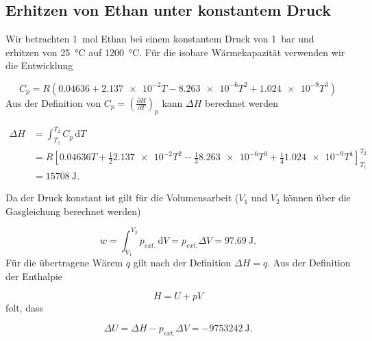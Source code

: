   \subsection{Erhitzen von Ethan unter konstantem Druck}
  
    Wir betrachten \SI[mode=text]{1}{\mole} Ethan bei einem konstantem Druck von \SI[mode=text]{1}{bar} und erhitzen von \SI[mode=text]{25}{\degreeCelsius} auf \SI[mode=text]{1200}{\degreeCelsius}. Für die isobare Wärmekapazität verwenden wir die Entwicklung
    
      \begin{equation}
        C_p = R \left(0.04636 + \num{2.137e-2} T - \num{8.263e-6}T^2 + \num{1.024e-9} T^3\right)
      \end{equation}
      Aus der Definition von $C_p = \left(\frac{\partial H}{\partial T}\right)_p$ kann $\Delta H$ berechnet werden
      
        \begin{equation}
          \begin{split}
            \Delta H &= \int_{T_1}^{T_2} C_p \, \text{d} T \\
                     &= R \left[0.04636 T + \frac{1}{2} \num{2.137e-2} T^2 - \frac{1}{3} \num{8.263e-6}T^3 + \frac{1}{4} \num{1.024e-9} T^4\right]_{T_1}^{T_2} \\
                     &= \SI[mode=text]{15708}{\joule}.
          \end{split}
        \end{equation}
      
      Da der Druck konstant ist gilt für die Volumensarbeit ($V_1$ und $V_2$ können über die Gasgleichung berechnet werden)
      
        \begin{equation}
          w = \int_{V_1}^{V_2} p_{ext.} \, \text{d} V = p_{ext.} \Delta V = \SI[mode=text]{97.69}{\joule}.      
        \end{equation}
      Für die übertragene Wärem $q$ gilt nach der Definition $\Delta H = q$. Aus der Definition der Enthalpie 
      
        \begin{equation}
          H = U + pV
        \end{equation}
        folt, dass 
        
        \begin{equation}
          \Delta U = \Delta H - p_{ext.} \Delta V = \SI[mode=text]{-9753242}{\joule}.
        \end{equation}
      
      
  
    